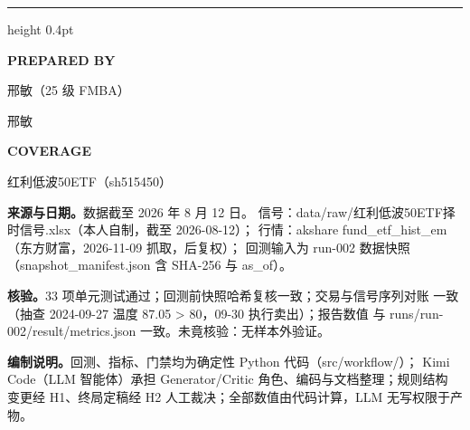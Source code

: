 \documentclass[a4paper,10pt]{article}
\newcommand{\DataDate}{2026 年 8 月 12 日}
\newcommand{\TeamName}{邢敏}
\newcommand{\ReportAuthor}{邢敏（25 级 FMBA）}
\newcommand{\Coverage}{红利低波50ETF（sh515450）}
\begin{document}
{\color{MemoRule}\hrule height 0.4pt}\medskip
\begin{minipage}[t]{0.36\textwidth}
\vspace{0pt}\small
\setlength{\parskip}{3pt}
\textbf{PREPARED BY}\par\ReportAuthor\par\TeamName\par
\medskip\textbf{COVERAGE}\par\Coverage
\end{minipage}\hfill
\begin{minipage}[t]{0.60\textwidth}
\vspace{0pt}\footnotesize
\setlength{\parskip}{3pt}
\textbf{来源与日期。}数据截至 \DataDate。
信号：data/raw/红利低波50ETF择时信号.xlsx（本人自制，截至 2026-08-12）；
行情：akshare fund\_etf\_hist\_em（东方财富，2026-11-09 抓取，后复权）；
回测输入为 run-002 数据快照（snapshot\_manifest.json 含 SHA-256 与 as\_of）。

\textbf{核验。}33 项单元测试通过；回测前快照哈希复核一致；交易与信号序列对账
一致（抽查 2024-09-27 温度 87.05 \textgreater{} 80，09-30 执行卖出）；报告数值
与 runs/run-002/result/metrics.json 一致。未竟核验：无样本外验证。

\textbf{编制说明。}回测、指标、门禁均为确定性 Python 代码（src/workflow/）；
Kimi Code（LLM 智能体）承担 Generator/Critic 角色、编码与文档整理；规则结构
变更经 H1、终局定稿经 H2 人工裁决；全部数值由代码计算，LLM 无写权限于产物。
\end{minipage}

\clearpage
\normalsize

\end{document}

